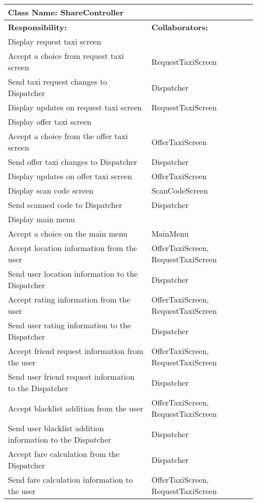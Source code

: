 \documentclass[english]{article}
\begin{document}
    \begin{table}[!ht]
        \centering
        \begin{tabular}{|p{8cm}|p{4cm}|}
        \hline 
        \multicolumn{2}{|l|}{\textbf{Class Name: ShareController}} \\
        \hline
        \textbf{Responsibility:} & \textbf{Collaborators:} \\
        \hline
        Display request taxi screen & \\
        \hline
        Accept a choice from request taxi screen & RequestTaxiScreen \\
        \hline
        Send taxi request changes to Dispatcher & Dispatcher\\
        \hline
        Display updates on request taxi screen & RequestTaxiScreen\\
        \hline
        Display offer taxi screen & \\
        \hline
        Accept a choice from the offer taxi screen & OfferTaxiScreen \\
        \hline
        Send offer taxi changes to Dispatcher & Dispatcher\\
        \hline
        Display updates on offer taxi screen & OfferTaxiScreen\\
        \hline
        Display scan code screen & ScanCodeScreen \\
        \hline
        Send scanned code to Dispatcher & Dispatcher \\
        \hline
        Display main menu & \\
        \hline
        Accept a choice on the main menu & MainMenu\\
        \hline
        Accept location information from the user & OfferTaxiScreen, RequestTaxiScreen\\
        \hline
        Send user location information to the Dispatcher & Dispatcher \\
        \hline
        Accept rating information from the user & OfferTaxiScreen, RequestTaxiScreen \\
        \hline
        Send user rating information to the Dispatcher & Dispatcher \\
        \hline
        Accept friend request information from the user & OfferTaxiScreen, RequestTaxiScreen \\
        \hline
        Send user friend request information to the Dispatcher & Dispatcher \\
        \hline
        Accept blacklist addition from the user & OfferTaxiScreen, RequestTaxiScreen \\
        \hline
        Send user blacklist addition information to the Dispatcher & Dispatcher \\
        \hline
        Accept fare calculation from the Dispatcher & Dispatcher \\
        \hline
        Send fare calculation information to the user & OfferTaxiScreen, RequestTaxiScreen \\
        \hline
        \end{tabular}
    \end{table} 
    
\end{document}
